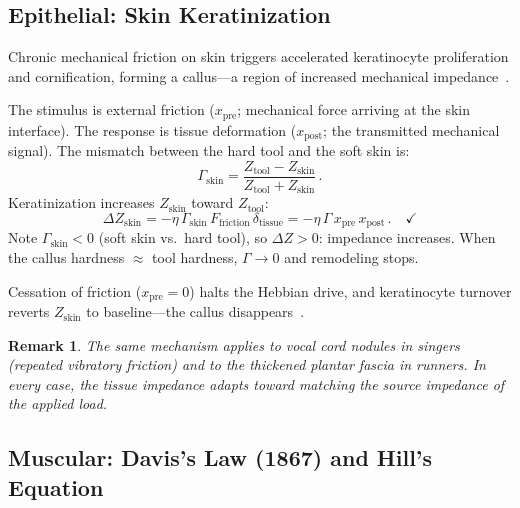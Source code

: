 \documentclass[aps,pre,twocolumn,superscriptaddress,floatfix]{revtex4-2}
\newtheorem{remark}{Remark}
\begin{document}
\subsection{Epithelial: Skin Keratinization}
\label{sec:skin}

Chronic mechanical friction on skin triggers accelerated
keratinocyte proliferation and cornification, forming
a callus---a region of increased mechanical
impedance~\cite{Thomas2010}.

The stimulus is external friction ($x_{\text{pre}}$;
mechanical force arriving at the skin interface).
The response is tissue deformation ($x_{\text{post}}$;
the transmitted mechanical signal).
The mismatch between the hard tool and the soft skin is:
\begin{equation}
  \Gamma_{\text{skin}} =
  \frac{Z_{\text{tool}} - Z_{\text{skin}}}
       {Z_{\text{tool}} + Z_{\text{skin}}}\,.
\end{equation}
Keratinization increases $Z_{\text{skin}}$ toward
$Z_{\text{tool}}$:
\begin{equation}
  \Delta Z_{\text{skin}}
  = -\eta\,\Gamma_{\text{skin}}\,
    F_{\text{friction}}\,\delta_{\text{tissue}}
  = -\eta\,\Gamma\,x_{\text{pre}}\,x_{\text{post}}\,.
  \quad \checkmark
  \label{eq:skin-C2}
\end{equation}
Note $\Gamma_{\text{skin}} < 0$ (soft skin vs.\ hard tool),
so $\Delta Z > 0$: impedance increases.
When the callus hardness $\approx$ tool hardness,
$\Gamma \to 0$ and remodeling stops.

Cessation of friction ($x_{\text{pre}} = 0$) halts the
Hebbian drive, and keratinocyte turnover reverts
$Z_{\text{skin}}$ to baseline---the callus
disappears~\cite{Thomas2010}.

\begin{remark}
The same mechanism applies to vocal cord nodules in
singers (repeated vibratory friction) and to the
thickened plantar fascia in runners.
In every case, the tissue impedance adapts toward
matching the source impedance of the applied load.
\end{remark}


\subsection{Muscular: Davis's Law (1867) and Hill's Equation}
\label{sec:muscle}
\end{document}
